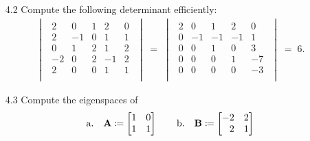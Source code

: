 \documentclass[11pt]{article}
\begin{document}
\begin{enumerate}
    \item[4.2] Compute the following determinant efficiently:
          \[
              \begin{aligned}
                  \begin{vmatrix}
                      \begin{array}{rrrrr}
                          2  & 0  & 1 & 2  & 0 \\
                          2  & -1 & 0 & 1  & 1 \\
                          0  & 1  & 2 & 1  & 2 \\
                          -2 & 0  & 2 & -1 & 2 \\
                          2  & 0  & 0 & 1  & 1 \\
                      \end{array}
                  \end{vmatrix}
                  \; = \;
                  \begin{vmatrix}
                      \begin{array}{rrrrr}
                          2 & 0  & 1  & 2  & 0  \\
                          0 & -1 & -1 & -1 & 1  \\
                          0 & 0  & 1  & 0  & 3  \\
                          0 & 0  & 0  & 1  & -7 \\
                          0 & 0  & 0  & 0  & -3 \\
                      \end{array}
                  \end{vmatrix}
                  \; = \;
                  6.
              \end{aligned}
          \]

    \item[4.3] Compute the eigenspaces of
          \[
              \text{a.} \quad
              \mat{A} \coloneq
              \begin{bmatrix}
                  1 & 0 \\
                  1 & 1 \\
              \end{bmatrix}
              \qquad
              \text{b.} \quad
              \mat{B} \coloneq
              \begin{bmatrix*}[r]
                  -2 & 2 \\
                  2 & 1 \\
              \end{bmatrix*}
          \]


\end{enumerate}
\end{document}

